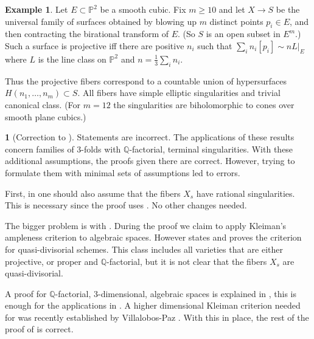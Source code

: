 \documentclass{amsart}
\theoremstyle{definition}
\newtheorem{say}[thm]{}
\newtheorem{exmp}[thm]{Example}
\theoremstyle{remark}
\newcommand{\p}[0]{{\mathbb P}}
\newcommand{\q}[0]{{\mathbb Q}}
\begin{document}
\begin{exmp} \label{bad.fams.exmp}
Let $E\subset \p^2$ be a smooth cubic. Fix $m\geq 10$ and let  $X\to S$ be the universal family of surfaces obtained by blowing up $m$ distinct points $p_i\in E$, and then contracting the birational transform of $E$.  (So $S$ is an open subset in $E^m$.) Such a surface is projective iff there are positive $n_i$ such that
$\sum_i n_i[p_i]\sim  nL|_E$  where $L$ is the line class on $\p^2$ and $n=\frac13 \sum_i n_i$. 

Thus  the projective fibers 
correspond to a countable union of hypersurfaces
$H(n_1,\dots, n_m)\subset S$.  All fibers have simple elliptic singularities and trivial canonical class.
(For $m=12$ the singularities are biholomorphic to cones over smooth plane cubics.) 
\end{exmp}



\begin{say}[Correction to {\cite[Chap.12]{km-flips}}]
\label{corr.12.2.10}
Statements \cite[12.2.6 and 12.2.10]{km-flips} are incorrect.
The applications of these results concern families of 3-folds with $\q$-factorial, terminal singularities. With these additional assumptions,
the proofs given there   are correct. However,  trying to formulate them with  minimal sets of  assumptions  led to  errors.

First, in  \cite[12.2.6]{km-flips} one should also assume that the fibers $X_s$ have rational singularities. This is necessary since the proof uses 
\cite[12.1.5]{km-flips}. No other changes needed.

The bigger problem is with  \cite[12.2.10]{km-flips}. During the proof  we claim to apply Kleiman's ampleness criterion to
algebraic spaces. However \cite{Kleiman66b}  states and proves
the criterion  for quasi-divisorial schemes.  This class includes all varieties that are either   projective, or proper and  $\q$-factorial, but it is not clear  that the fibers $X_s$ are quasi-divisorial.

A proof for 
$\q$-factorial, 3-dimensional, algebraic spaces is explained in \cite[5.1.3]{k-etc}, this is enough for the applications in \cite{km-flips}.
A higher dimensional Kleiman criterion needed for  \cite[12.2.10]{km-flips}
  was recently established by  Villalobos-Paz  \cite{dvp}. With this in place, the rest of the proof of \cite[12.2.10]{km-flips} is correct.
\end{say}
\end{document}
